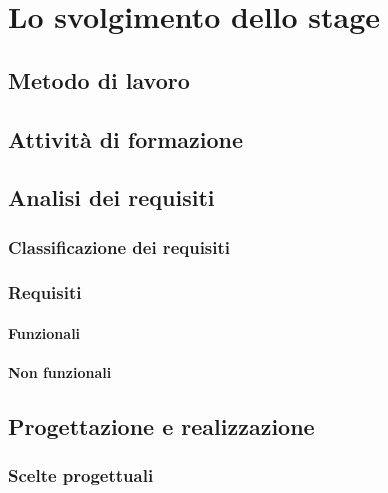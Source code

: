 
\chapter{Lo svolgimento dello stage}
\label{cap:svolgimento-stage}


\section{Metodo di lavoro}




\section{Attività di formazione}

\section{Analisi dei requisiti}
\subsection{Classificazione dei requisiti}
\subsection{Requisiti}
\subsubsection{Funzionali}
\subsubsection{Non funzionali}


\section{Progettazione e realizzazione}

\subsection{Scelte progettuali}

